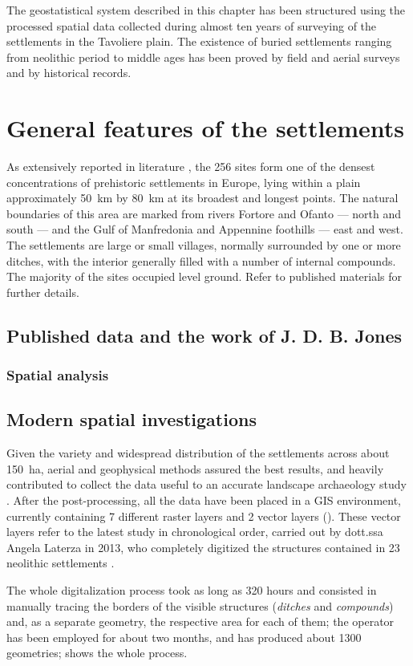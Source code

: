     The geostatistical system described in this chapter has been structured using the processed spatial data collected during almost ten years of surveying of the settlements in the Tavoliere plain. The existence of buried settlements ranging from neolithic period to middle ages has been proved by field and aerial surveys and by historical records.

    \section{General features of the settlements}
        As extensively reported in literature \cite{intro-tavoliere}, the 256 sites form one of the densest concentrations of prehistoric settlements in Europe, lying within a plain approximately \SI{50}{\kilo\meter} by \SI{80}{\kilo\meter} at its broadest and longest points. The natural boundaries of this area are marked from rivers Fortore and Ofanto --- north and south --- and the Gulf of Manfredonia and Appennine foothills --- east and west.\\
        The settlements are large or small villages, normally surrounded by one or more ditches, with the interior generally filled with a number of internal compounds. The majority of the sites occupied level ground. Refer to published materials for further details.

        \subsection{Published data and the work of J. D. B. Jones\label{sec:jones}}

            \subsubsection{Spatial analysis}

        \pagebreak
        \subsection{Modern spatial investigations}
            Given the variety and widespread distribution of the settlements across about \SI{150}{\hectare}, aerial and geophysical methods assured the best results, and heavily contributed to collect the data useful to an accurate landscape archaeology study \cite[pp.~45--48]{remote-ciminale}. After the post-processing, all the data have been placed in a GIS environment, currently containing 7 different raster layers and 2 vector layers (). These vector layers refer to the latest study in chronological order, carried out by dott.ssa Angela Laterza in 2013, who completely digitized the structures contained in 23 neolithic settlements \cite{laterza}. 
            
            The whole digitalization process took as long as 320 hours and consisted in manually tracing the borders of the visible structures (\emph{ditches} and \emph{compounds}) and, as a separate geometry, the respective area for each of them; the operator has been employed for about two months, and has produced about 1300 geometries;  shows the whole process.

